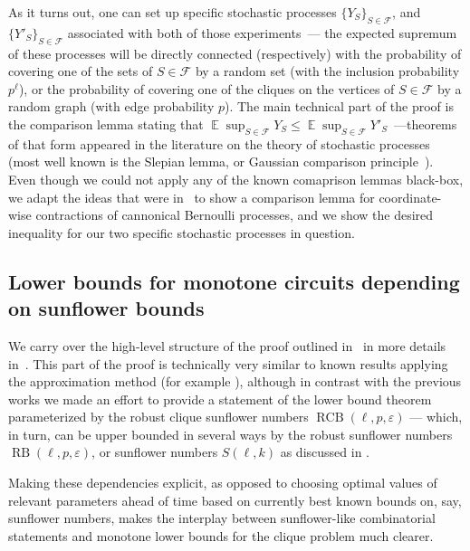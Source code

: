 \documentclass[10pt,a4paper]{article}
\DeclareMathOperator{\E}{\mathbb{E}}
\newcommand{\RCB}{\mathop{RCB}}
\newcommand{\RB}{\mathop{RB}}
\begin{document}
As it turns out, one can set up specific stochastic processes $\{Y_S\}_{S \in \mathcal{F}}$, and $\{Y'_S\}_{S \in \mathcal{F}}$ associated with both of those experiments~--- the expected supremum of these processes will be directly connected (respectively) with the probability of covering one of the sets of $S \in \mathcal{F}$ by a random set (with the inclusion probability $p^\ell$), or the probability of covering one of the cliques on the vertices of $S \in \mathcal{F}$ by a random graph (with edge probability $p$). The main technical part of the proof is the comparison lemma stating that $\E \sup_{S \in \mathcal{F}} Y_S \leq \E \sup_{S \in \mathcal{F}} Y'_S$~---theorems of that form appeared in the literature on the theory of stochastic processes (most well known is the Slepian lemma, or Gaussian comparison principle~\cite[Corollary 2.10.12]{talagrand2014upper}). Even though we could not apply any of the known comaprison lemmas black-box, we adapt the ideas that were in~\cite{talagrand93} to show a comparison lemma for coordinate-wise contractions of cannonical Bernoulli processes, and we show the desired inequality for our two specific stochastic processes in question.
\subsection{Lower bounds for monotone circuits depending on sunflower bounds \label{sec:intro-clique-sunflower-bounds}}
We carry over the high-level structure of the proof outlined in~ in more details in~. This part of the proof is technically very similar to known results applying the approximation method (for example \cite{razborov1985lower,alon87,cavalar2022}), although in contrast with the previous works we made an effort to provide a statement of the lower bound theorem parameterized by the robust clique sunflower numbers $\RCB(\ell, p, \varepsilon)$ --- which, in turn, can be upper bounded in several ways by the robust sunflower numbers $\RB(\ell, p, \varepsilon)$, or sunflower numbers $S(\ell ,k)$ as discussed in .

Making these dependencies explicit, as opposed to choosing optimal values of relevant parameters ahead of time based on currently best known bounds on, say, sunflower numbers, makes the interplay between sunflower-like combinatorial statements and monotone lower bounds for the clique problem much clearer.
\end{document}
